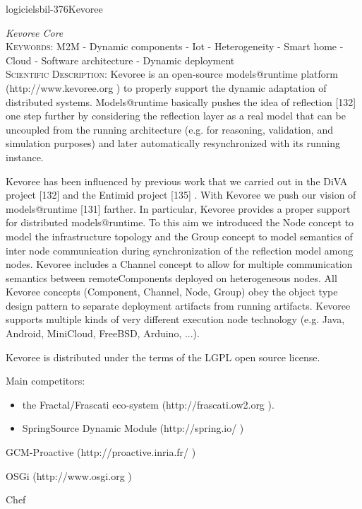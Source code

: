 \documentclass{ra2018}
\begin{document}
 \begin{module}{logiciels}{bil-376}{Kevoree}

 \textit{Kevoree Core} \\ 


   \textsc{Keywords:} M2M - Dynamic components - Iot - Heterogeneity - Smart home - Cloud - Software architecture - Dynamic deployment \\ 


    \textsc{Scientific Description:} Kevoree is an open-source models@runtime platform (http://www.kevoree.org ) to properly support the dynamic adaptation of distributed systems. Models@runtime basically pushes the idea of reflection [132] one step further by considering the reflection layer as a real model that can be uncoupled from the running architecture (e.g. for reasoning, validation, and simulation purposes) and later automatically resynchronized with its running instance.

Kevoree has been influenced by previous work that we carried out in the DiVA project [132] and the Entimid project [135] . With Kevoree we push our vision of models@runtime [131] farther. In particular, Kevoree provides a proper support for distributed models@runtime. To this aim we introduced the Node concept to model the infrastructure topology and the Group concept to model semantics of inter node communication during synchronization of the reflection model among nodes. Kevoree includes a Channel concept to allow for multiple communication semantics between remoteComponents deployed on heterogeneous nodes. All Kevoree concepts (Component, Channel, Node, Group) obey the object type design pattern to separate deployment artifacts from running artifacts. Kevoree supports multiple kinds of very different execution node technology (e.g. Java, Android, MiniCloud, FreeBSD, Arduino, ...).

Kevoree is distributed under the terms of the LGPL open source license.

Main competitors:
\begin{itemize}
\item    the Fractal/Frascati eco-system (http://frascati.ow2.org ).

 \item       SpringSource Dynamic Module (http://spring.io/ )
\end{itemize}
    GCM-Proactive (http://proactive.inria.fr/ )

    OSGi (http://www.osgi.org )

    Chef


\end{module}
\end{document}
